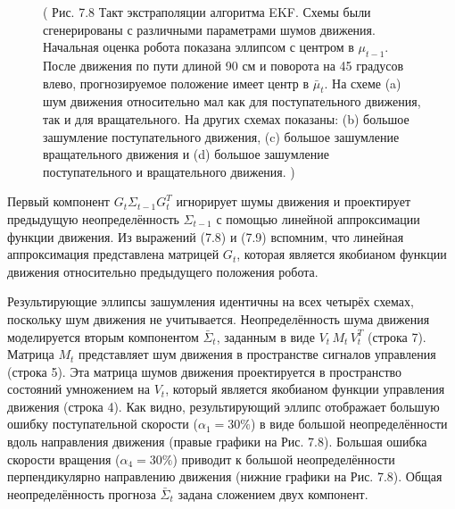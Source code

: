 \documentclass[10pt,a4paper]{article}
\begin{document}
\begin{figure}[H]
	\caption{ (  Рис. 7.8 Такт экстраполяции алгоритма EKF. Схемы были сгенерированы с различными параметрами шумов движения. Начальная оценка робота показана эллипсом с центром в $\mu_{t-1}$. После движения по пути длиной 90 см и поворота на 45 градусов влево, прогнозируемое положение имеет центр в $\bar{\mu}_t$. На схеме (a) шум движения относительно мал как для поступательного движения, так и для вращательного. На других схемах показаны: (b) большое зашумление поступательного движения, (c) большое зашумление вращательного движения и (d) большое зашумление поступательного и вращательного движения. )}
	\label{fig:78orig}
\end{figure}

Первый компонент $G_t\varSigma_{t-1}G_t^T$ игнорирует шумы движения и проектирует предыдущую неопределённость $\varSigma_{t-1}$ с помощью линейной аппроксимации функции движения. Из выражений (7.8) и (7.9) вспомним, что линейная аппроксимация представлена матрицей $G_t$, которая является якобианом функции движения относительно предыдущего положения робота.

Результирующие эллипсы зашумления идентичны на всех четырёх схемах, поскольку шум движения не учитывается. Неопределённость шума движения моделируется вторым компонентом $\bar{\varSigma}_t$, заданным в виде $V_t\, M_t\, V_t^T$ (строка 7). Матрица $M_t$ представляет шум движения в пространстве сигналов управления (строка 5). Эта матрица шумов движения проектируется в пространство состояний умножением на $V_t$, который является якобианом функции управления движения (строка 4). Как видно, результирующий эллипс отображает большую ошибку поступательной скорости ($\alpha_1 = 30\%$) в виде большой неопределённости вдоль направления движения (правые графики на Рис. 7.8).
Большая ошибка скорости вращения ($\alpha_4 = 30\%$) приводит к большой неопределённости перпендикулярно направлению движения (нижние графики на Рис. 7.8). Общая неопределённость прогноза $\bar{\varSigma}_t$ задана сложением двух компонент.
\end{document}
